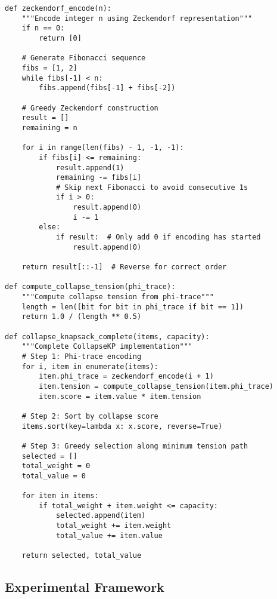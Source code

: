 \documentclass[11pt]{article}
\theoremstyle{remark}
\theoremstyle{definition}
\begin{document}
\begin{lstlisting}[caption=Zeckendorf Encoding and Tension Calculation]
def zeckendorf_encode(n):
    """Encode integer n using Zeckendorf representation"""
    if n == 0:
        return [0]
    
    # Generate Fibonacci sequence
    fibs = [1, 2]
    while fibs[-1] < n:
        fibs.append(fibs[-1] + fibs[-2])
    
    # Greedy Zeckendorf construction
    result = []
    remaining = n
    
    for i in range(len(fibs) - 1, -1, -1):
        if fibs[i] <= remaining:
            result.append(1)
            remaining -= fibs[i]
            # Skip next Fibonacci to avoid consecutive 1s
            if i > 0:
                result.append(0)
                i -= 1
        else:
            if result:  # Only add 0 if encoding has started
                result.append(0)
    
    return result[::-1]  # Reverse for correct order

def compute_collapse_tension(phi_trace):
    """Compute collapse tension from phi-trace"""
    length = len([bit for bit in phi_trace if bit == 1])
    return 1.0 / (length ** 0.5)

def collapse_knapsack_complete(items, capacity):
    """Complete CollapseKP implementation"""
    # Step 1: Phi-trace encoding
    for i, item in enumerate(items):
        item.phi_trace = zeckendorf_encode(i + 1)
        item.tension = compute_collapse_tension(item.phi_trace)
        item.score = item.value * item.tension
    
    # Step 2: Sort by collapse score
    items.sort(key=lambda x: x.score, reverse=True)
    
    # Step 3: Greedy selection along minimum tension path
    selected = []
    total_weight = 0
    total_value = 0
    
    for item in items:
        if total_weight + item.weight <= capacity:
            selected.append(item)
            total_weight += item.weight
            total_value += item.value
    
    return selected, total_value
\end{lstlisting}

\subsection{Experimental Framework}
\end{document}
